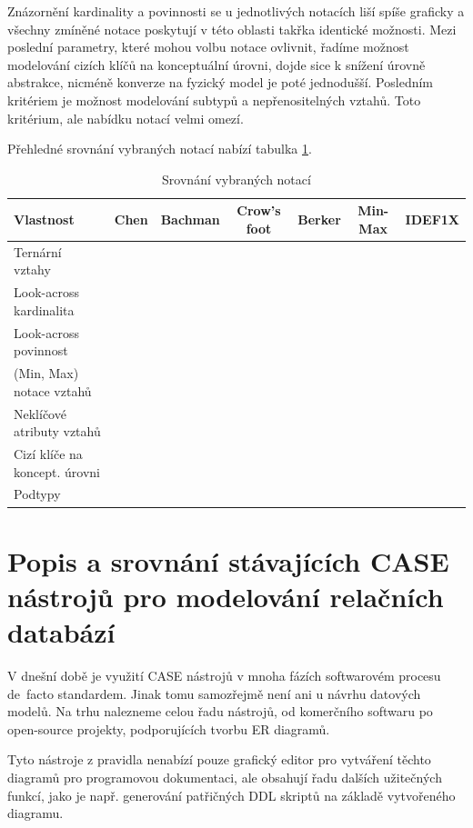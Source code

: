 \documentclass[czech,bachelor,public,dept460,male,oneside]{diploma}
\newcommand{\xmark}{\ding{55}}
\newcommand{\cmark}{\ding{51}}
\begin{document}
	Znázornění kardinality a povinnosti se u jednotlivých notacích liší spíše graficky a všechny zmíněné notace poskytují v této oblasti takřka identické možnosti. Mezi poslední parametry, které mohou volbu notace ovlivnit, řadíme možnost modelování cizích klíčů na konceptuální úrovni, dojde sice k snížení úrovně abstrakce, nicméně konverze na fyzický model je poté jednodušší. Posledním kritériem je možnost modelování subtypů a nepřenositelných vztahů. Toto kritérium, ale nabídku notací velmi omezí. 
	
	Přehledné srovnání vybraných notací nabízí tabulka \ref{tab:notationCmp}.
	
	\begin{table}[h!]
		\centering
		\caption{Srovnání vybraných notací}
		\label{tab:notationCmp}
		\begin{tabular}{l c c c c c c}
			\toprule
			Vlastnost & Chen & Bachman & Crow's foot & Berker & Min-Max & IDEF1X \\
			\midrule
			Ternární vztahy & \cmark & \xmark & \xmark & \xmark & \xmark & \xmark \\
			Look-across kardinalita & \cmark & \cmark & \cmark & \cmark & \xmark & \cmark \\
			Look-across povinnost & \xmark & \xmark & \cmark & \xmark & \xmark & \cmark \\
			(Min, Max) notace vztahů & \xmark & \xmark & \cmark & \xmark & \cmark & \cmark \\
			Neklíčové atributy vztahů & \cmark & \xmark & \xmark & \xmark & \xmark & \xmark \\
			Cizí klíče na koncept. úrovni & \xmark & \cmark & \xmark & \xmark & \xmark & \cmark \\
			Podtypy & \cmark & \cmark & \cmark & \cmark & \cmark & \xmark \\
			\midrule
		\end{tabular}
	\end{table}

\newpage
\section{Popis a srovnání stávajících CASE nástrojů pro modelování relačních databází}
V dnešní době je využití CASE nástrojů v mnoha fázích softwarovém procesu de~facto standardem. Jinak tomu samozřejmě není ani u návrhu datových modelů. Na trhu nalezneme celou řadu nástrojů, od komerčního softwaru po open-source projekty, podporujících tvorbu ER diagramů. 

Tyto nástroje z pravidla nenabízí pouze grafický editor pro vytváření těchto diagramů pro programovou dokumentaci, ale obsahují řadu dalších užitečných funkcí, jako je např. generování patřičných DDL skriptů na základě vytvořeného diagramu.
\end{document}

